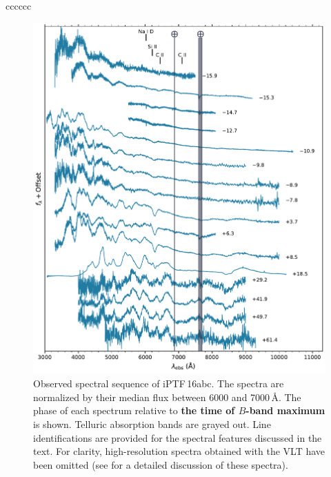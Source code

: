 \documentclass[twocolumn]{aastex61}
\newcommand{\abc}{iPTF\,16abc}
\begin{document}
\begin{deluxetable}{cccccc}
  \enddata
\end{deluxetable}

\begin{figure}[!htb]
  \centering
  \includegraphics[width=5.5in]{spectra.pdf}
  \caption{
  Observed spectral sequence of \abc. The spectra are normalized by their
  median flux between 6000 and 7000$\,\textrm{\AA}$. The phase of each
  spectrum relative to \textbf{the time of $B$-band maximum} is shown.
  Telluric absorption bands are grayed out. Line identifications are provided
  for the spectral features discussed in the text. For clarity,
  high-resolution spectra obtained with the VLT have been omitted (see
  \citealt{2017A&A...606A.111F} for a detailed discussion of these spectra).}
  \label{fig:spec_seq}
\end{figure}
\end{document}
